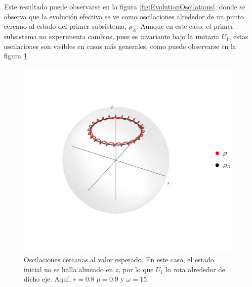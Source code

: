 Este resultado puede observarse en la figura \ref{fig:EvolutionOscilations}, donde se observa que la evolución efectiva se ve como oscilaciones alrededor de un punto cercano al estado del primer subsistema, $\rho_{A}$. Aunque en este caso, el primer subsistema no experimenta cambios, pues es invariante bajo la unitaria $U_{1}$, estas oscilaciones son visibles en casos más generales, como puede observarse en la figura \ref{fig:GeneralOscilations1}.

\begin{figure}[ht!]
    \centering
    \includegraphics[width=0.6\linewidth]{chapter3/figures_separable/U1xU2_H1=(sz)_H2=15(sx-sy)_z=0.8_p=0.9_wXY=0.5.png}
    \caption{Oscilaciones cercanas al valor esperado. En este caso, el estado inicial no se halla alineado en $z$, por lo que $U_{1}$ lo rota alrededor de dicho eje. Aquí, $r=0.8$ $p=0.9$ y $\omega=15$. }
    \label{fig:GeneralOscilations1}
\end{figure}
